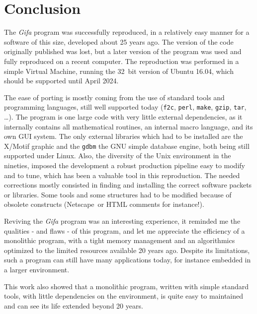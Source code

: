 \hypertarget{conclusion}{%
\section{Conclusion}\label{conclusion}}

The \emph{Gifa} program was successfully reproduced, in a relatively easy manner
for a software of this size, developed about 25 years ago.
The version of the code originally published was lost, but a later version of
the program was used and fully reproduced on a recent computer.
The reproduction was performed in a simple Virtual Machine, running the
32\ bit version of Ubuntu 16.04, which should be supported until April
2024.

The ease of porting is mostly coming from the use of standard tools and
programming languages, still well supported today (\texttt{f2c},
\texttt{perl}, \texttt{make}, \texttt{gzip}, \texttt{tar}, \ldots{}).
The program is one large code with very little external dependencies, as
it internally contains all mathematical routines, an internal macro
language, and its own GUI system. The only external libraries which had
to be installed are the X/Motif graphic and the \texttt{gdbm} the GNU
simple database engine, both being still supported under Linux. Also,
the diversity of the Unix environment in the nineties, imposed the
development a robust production pipeline easy to modify and to tune,
which has been a valuable tool in this reproduction.
The needed corrections
mostly consisted in finding and installing the correct software packets or
libraries.
Some tools and some structures had to be modified because of obsolete constructs
(Netscape\texttrademark\ or HTML comments for instance!).

Reviving the \emph{Gifa} program was an interesting experience, it
reminded me the qualities - and flaws - of this program, and
let me appreciate the efficiency of a monolithic program, with a tight memory management and
an algorithmics optimized to the limited resources available 20 years
ago. Despite its limitations, such a program can still have many
applications today, for instance embedded in a larger environment.

This work also showed that a monolithic program, written with simple
standard tools, with little dependencies on the environment, is quite
easy to maintained and can see its life extended beyond 20 years.

